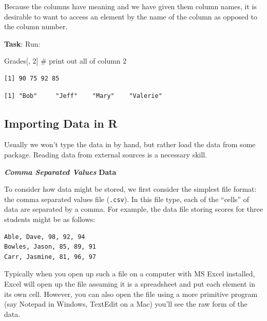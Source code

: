 \documentclass[
  letterpaper,
  DIV=11,
  numbers=noendperiod]{scrreprt}
\newenvironment{Shaded}{\begin{snugshade}}{\end{snugshade}}
\newcommand{\CommentTok}[1]{\textcolor[rgb]{0.37,0.37,0.37}{#1}}
\newcommand{\DecValTok}[1]{\textcolor[rgb]{0.68,0.00,0.00}{#1}}
\newcommand{\NormalTok}[1]{\textcolor[rgb]{0.00,0.23,0.31}{#1}}
\newcommand{\SpecialCharTok}[1]{\textcolor[rgb]{0.37,0.37,0.37}{#1}}
\begin{document}
Because the columns have meaning and we have given them column names, it
is desirable to want to access an element by the name of the column as
opposed to the column number.

\textbf{Task}: Run:

\begin{Shaded}
\begin{Highlighting}[]
\NormalTok{Grades[, }\DecValTok{2}\NormalTok{]       }\CommentTok{\# print out all of column 2 }
\end{Highlighting}
\end{Shaded}

\begin{verbatim}
[1] 90 75 92 85
\end{verbatim}

\begin{Shaded}
\end{Shaded}

\begin{verbatim}
[1] "Bob"     "Jeff"    "Mary"    "Valerie"
\end{verbatim}

\subsection{Importing Data in R}\label{importing-data-in-r}

Usually we won't type the data in by hand, but rather load the data from
some package. Reading data from external sources is a necessary skill.

\textbf{\emph{Comma Separated Values}} \textbf{Data}

To consider how data might be stored, we first consider the simplest
file format: the comma separated values file (\texttt{.csv}). In this
file type, each of the ``cells'' of data are separated by a comma. For
example, the data file storing scores for three students might be as
follows:

\begin{verbatim}
Able, Dave, 98, 92, 94
Bowles, Jason, 85, 89, 91
Carr, Jasmine, 81, 96, 97
\end{verbatim}

Typically when you open up such a file on a computer with MS Excel
installed, Excel will open up the file assuming it is a spreadsheet and
put each element in its own cell. However, you can also open the file
using a more primitive program (say Notepad in Windows, TextEdit on a
Mac) you'll see the raw form of the data.
\end{document}
